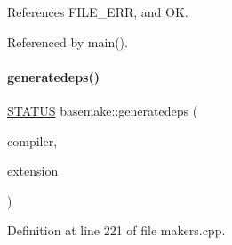 References F\+I\+L\+E\+\_\+\+E\+RR, and OK.



Referenced by main().

\mbox{\label{namespacebasemake_a0dfd9121ee780c0faaf7eb9ac4c58d63}} 
\paragraph{\texorpdfstring{generatedeps()}{generatedeps()}}
{\footnotesize\ttfamily \mbox{\hyperlink{functions_8h_a32c27cc471df37f4fc818d65de0a56c4}{S\+T\+A\+T\+US}} basemake\+::generatedeps (\begin{DoxyParamCaption}\item[{\mbox{\hyperlink{namespacecompilation_ab8b552e73f4f5a4912982468f052f089}{compilation\+::\+C\+O\+M\+P\+IL}}}]{compiler,  }\item[{std\+::string}]{extension }\end{DoxyParamCaption})}



Definition at line 221 of file makers.\+cpp.


